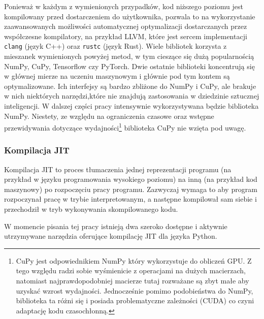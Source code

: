 \documentclass[10pt, a4paper]{article}
\newcommand{\code}[1]{\texttt{#1}}
\begin{document}
\begin{sloppypar}
    Ponieważ w każdym z wymienionych przypadków, kod niższego poziomu jest kompilowany
    przed dostarczeniem do użytkownika, pozwala to na wykorzystanie zaawansowanych możliwości
    automatycznej optymalizacji dostarczanych przez współczesne kompilatory, na przykład
    LLVM, które jest sercem implementacji \code{clang} (język C++) oraz \code{rustc} (język
    Rust). Wiele bibliotek korzysta z mieszanek wymienionych powyżej metod, w tym cieszące
    się dużą popularnością NumPy, CuPy, Tensorflow czy PyTorch. Dwie ostatnie biblioteki
    koncentrują się w głównej mierze na uczeniu maszynowym i głównie pod tym kontem są
    optymalizowane. Ich interfejsy są bardzo zbliżone do NumPy i CuPy, ale brakuje w
    nich niektórych narzędzi,które nie znajdują zastosowania w dziedzinie sztucznej
    inteligencji. W dalszej części pracy intensywnie wykorzystywana będzie biblioteka NumPy.
    Niestety, ze względu na ograniczenia czasowe oraz wstępne przewidywania dotyczące wydajności\footnote{CuPy
    jest odpowiednikiem NumPy który wykorzystuje do obliczeń GPU. Z tego względu radzi sobie
    wyśmienicie z operacjami na dużych macierzach, natomiast najprawdopodobniej macierze
    tutaj rozważane są zbyt małe aby uzyskać wzrost wydajności\cite{CPU_VS_GPU}.
    Jednocześnie pomimo podobieństwa do NumPy, biblioteka ta różni się i posiada problematyczne
    zależności (CUDA) co czyni adaptację kodu czasochłonną.} biblioteka CuPy nie wzięta pod
    uwagę.

    \subsubsection{Kompilacja JIT}


    Kompilacja JIT to proces tłumaczenia jednej reprezentacji programu (na przykład w
    języku programowania wysokiego poziomu) na inną (na przykład kod maszynowy) po rozpoczęciu
    pracy programu. Zazwyczaj wymaga to aby program rozpoczynał pracę w trybie
    interpretowanym, a następne kompilował sam siebie i przechodził w tryb wykonywania skompilowanego
    kodu.

    W momencie pisania tej pracy istnieją dwa szeroko dostępne i aktywnie utrzymywane narzędzia
    oferujące kompilację JIT dla języka Python.


\end{sloppypar}
\end{document}
